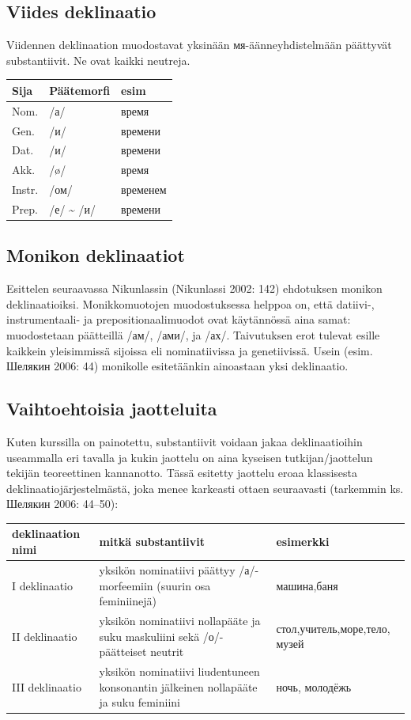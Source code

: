 \documentclass[]{scrreprt}
\begin{document}
\subsection{Viides deklinaatio}\label{viides-deklinaatio}

Viidennen deklinaation muodostavat yksinään мя-äänneyhdistelmään
päättyvät substantiivit. Ne ovat kaikki neutreja.

\begin{longtable}[c]{@{}lll@{}}
\toprule
Sija & Päätemorfi & esim\tabularnewline
\midrule
\endhead
Nom. & /а/ & время\tabularnewline
Gen. & /и/ & времени\tabularnewline
Dat. & /и/ & времени\tabularnewline
Akk. & /ø/ & время\tabularnewline
Instr. & /ом/ & временем\tabularnewline
Prep. & /е/ \textasciitilde{} /и/ & времени\tabularnewline
\bottomrule
\end{longtable}

\subsection{Monikon deklinaatiot}\label{monikon-deklinaatiot}

Esittelen seuraavassa Nikunlassin (Nikunlassi 2002: 142) ehdotuksen
monikon deklinaatioiksi. Monikkomuotojen muodostuksessa helppoa on, että
datiivi-, instrumentaali- ja prepositionaalimuodot ovat käytännössä aina
samat: muodostetaan päätteillä /ам/, /ами/, ja /ах/. Taivutuksen erot
tulevat esille kaikkein yleisimmissä sijoissa eli nominatiivissa ja
genetiivissä. Usein (esim. Шелякин 2006: 44) monikolle esitetäänkin
ainoastaan yksi deklinaatio.

\subsection{Vaihtoehtoisia
jaotteluita}\label{vaihtoehtoisia-jaotteluita}

Kuten kurssilla on painotettu, substantiivit voidaan jakaa
deklinaatioihin useammalla eri tavalla ja kukin jaottelu on aina
kyseisen tutkijan/jaottelun tekijän teoreettinen kannanotto. Tässä
esitetty jaottelu eroaa klassisesta deklinaatiojärjestelmästä, joka
menee karkeasti ottaen seuraavasti (tarkemmin ks. Шелякин 2006: 44--50):

\begin{longtable}[c]{@{}lll@{}}
\toprule
deklinaation nimi & mitkä substantiivit & esimerkki\tabularnewline
\midrule
\endhead
I deklinaatio & yksikön nominatiivi päättyy /а/-morfeemiin (suurin osa
feminiinejä) & машина,баня\tabularnewline
II deklinaatio & yksikön nominatiivi nollapääte ja suku maskuliini sekä
/о/-päätteiset neutrit & стол,учитель,море,тело, музей\tabularnewline
III deklinaatio & yksikön nominatiivi liudentuneen konsonantin jälkeinen
nollapääte ja suku feminiini & ночь, молодёжь\tabularnewline
\bottomrule
\end{longtable}
\end{document}
